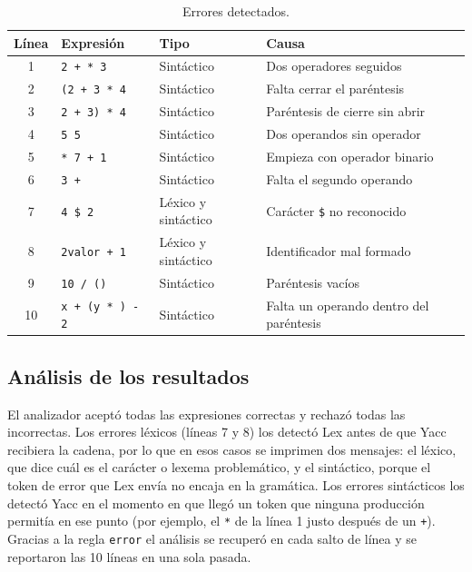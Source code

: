 \documentclass{article}
\begin{document}
    \begin{table}[H]
    \begin{center}
    \caption{Errores detectados.}
    \label{tab:errores}
    \begin{tabular}{|c|l|l|l|}
        \hline
        Línea & Expresión & Tipo & Causa \\
        \hline
        1 & \texttt{2 + * 3} & Sintáctico & Dos operadores seguidos \\
        \hline
        2 & \texttt{(2 + 3 * 4} & Sintáctico & Falta cerrar el paréntesis \\
        \hline
        3 & \texttt{2 + 3) * 4} & Sintáctico & Paréntesis de cierre sin abrir \\
        \hline
        4 & \texttt{5 5} & Sintáctico & Dos operandos sin operador \\
        \hline
        5 & \texttt{* 7 + 1} & Sintáctico & Empieza con operador binario \\
        \hline
        6 & \texttt{3 + } & Sintáctico & Falta el segundo operando \\
        \hline
        7 & \texttt{4 \$ 2} & Léxico y sintáctico & Carácter \texttt{\$} no reconocido \\
        \hline
        8 & \texttt{2valor + 1} & Léxico y sintáctico & Identificador mal formado \\
        \hline
        9 & \texttt{10 / ()} & Sintáctico & Paréntesis vacíos \\
        \hline
        10 & \texttt{x + (y * ) - 2} & Sintáctico & Falta un operando dentro del paréntesis \\
        \hline
    \end{tabular}
    \end{center}
    \end{table}

    \subsection{Análisis de los resultados}
    El analizador aceptó todas las expresiones correctas y rechazó todas las incorrectas. Los errores léxicos (líneas 7 y 8) los detectó Lex antes de que Yacc recibiera la cadena, por lo que en esos casos se imprimen dos mensajes: el léxico, que dice cuál es el carácter o lexema problemático, y el sintáctico, porque el token de error que Lex envía no encaja en la gramática. Los errores sintácticos los detectó Yacc en el momento en que llegó un token que ninguna producción permitía en ese punto (por ejemplo, el \texttt{*} de la línea 1 justo después de un \texttt{+}). Gracias a la regla \texttt{error} el análisis se recuperó en cada salto de línea y se reportaron las 10 líneas en una sola pasada.
\end{document}
